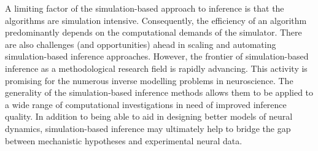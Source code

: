 A limiting factor of the simulation-based approach to inference is that the algorithms are simulation intensive. Consequently, the efficiency of an algorithm predominantly depends on the computational demands of the simulator. There are also challenges (and opportunities) ahead in scaling and automating simulation-based inference approaches. However, the frontier of simulation-based inference as a methodological research field is rapidly advancing. This activity is promising for the numerous inverse modelling problems in neuroscience. The generality of the simulation-based inference methods allows them to be applied to a wide range of computational investigations in need of improved inference quality. In addition to being able to aid in designing better models of neural dynamics, simulation-based inference may ultimately help to bridge the gap between mechanistic hypotheses and experimental neural data. 





